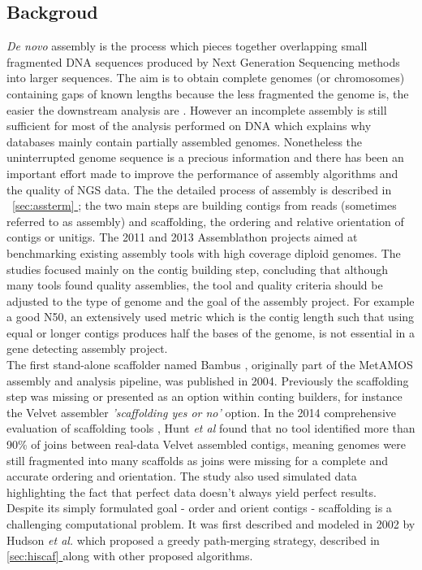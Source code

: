 \documentclass[10pt, twocolumn]{article}
\newcommand*{\fulleref}[1]{\hyperref[{#1}]{\autoref*{#1} \nameref*{#1}}}
\begin{document}
\subsection{Backgroud}
\textit{De novo} assembly is the process which pieces together overlapping small fragmented DNA sequences produced by Next Generation Sequencing methods into larger sequences. The aim is to obtain complete genomes (or chromosomes) containing gaps of known lengths because the less fragmented the genome is, the easier the downstream analysis are \cite{hunt_comprehensive_2014}. However an incomplete assembly is still sufficient for most of the analysis performed on DNA which explains why databases mainly contain partially assembled genomes. Nonetheless the uninterrupted genome sequence is a precious information and there has been an important effort made to improve the performance of assembly algorithms and the quality of NGS data. The the detailed process of assembly is described in ~\fulleref{sec:assterm}; the two main steps are building contigs from reads (sometimes referred to as assembly) and scaffolding, the ordering and relative orientation of contigs or unitigs. The 2011 and 2013 Assemblathon projects \cite{earl_assemblathon_2011} \cite{bradnam_assemblathon_2013} aimed at  benchmarking existing assembly tools with high coverage diploid genomes. The studies focused mainly on the contig building step, concluding that although many tools found quality assemblies, the tool and quality criteria should be adjusted to the type of genome and the goal of the assembly project. For example a good N50, an extensively used metric which is the contig length such that using equal or longer contigs produces half the bases of the genome, is not essential in a gene detecting assembly project. \\
The first stand-alone scaffolder named Bambus \cite{pop_hierarchical_2004}, originally part of the MetAMOS \cite{treangen_metamos:_2013} assembly and analysis pipeline, was published in 2004. Previously the scaffolding step was missing or presented as an option within conting builders, for instance the Velvet\cite{zerbino_velvet:_2008} assembler \textit{'scaffolding yes or no'} option. In the 2014 comprehensive evaluation of scaffolding tools \cite{hunt_comprehensive_2014-1}, Hunt \textit{et al} found that no tool identified more than 90\% of joins between real-data Velvet assembled contigs, meaning genomes were still fragmented into many scaffolds as joins were missing for a complete and accurate ordering and orientation. The study also used simulated data highlighting the fact that perfect data doesn't always yield perfect results. Despite its simply formulated goal - order and orient contigs - scaffolding is a challenging computational problem. It was first described and modeled in 2002 by Hudson \textit{et al.}\cite{huson_greedy_2002} which proposed a greedy path-merging strategy, described in \fulleref{sec:hiscaf} along with other proposed algorithms.
 
\end{document}
